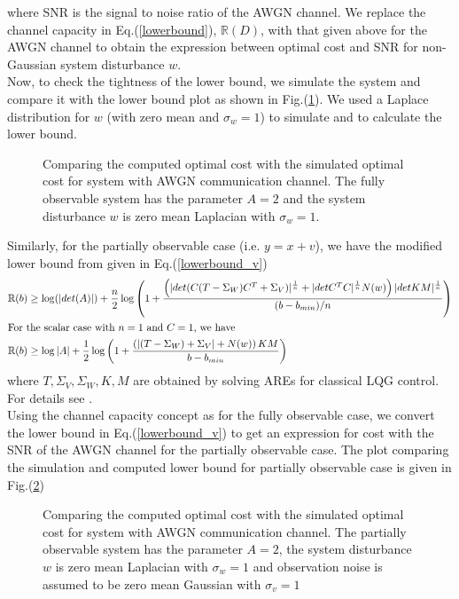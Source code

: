 \documentclass[12pt]{caltech_thesis_progress2}
\begin{document}
	where SNR is the signal to noise ratio of the AWGN channel. We replace the channel capacity in Eq.(\ref{lowerbound}), $\mathbb{R}(D)$, with that given above for the AWGN channel to obtain the expression between optimal cost and SNR for non-Gaussian system disturbance $w$.
	 \\Now, to check the tightness of the lower bound, we simulate the system and compare it with the lower bound plot as shown in Fig.(\ref{lowerbound_vs_laplace}). We used a Laplace distribution for $w$ (with zero mean and $\sigma_{w} = 1$) to simulate and to calculate the lower bound. 
		\begin{figure}[H]
			  \centering
			 \tiny{	
			}
			  \caption{Comparing the computed optimal cost with the simulated optimal cost for system with AWGN communication channel. The fully observable system has the parameter $A = 2$ and the system disturbance $w$ is zero mean Laplacian with $\sigma_{w} = 1$.}
			 \label{lowerbound_vs_laplace}
		\end{figure}	
		 Similarly, for the partially observable case (i.e. $y = x + v$), we have the modified lower bound from \cite{victoria} given in Eq.(\ref{lowerbound_v})
			  \begin{align}
			  \label{lowerbound_v}
			  \mathbb{R}(b) &\geq \log(|det(A)|) + \frac{n}{2} \log \left( 1 + \frac{\left(|det(C(T-\Sigma_{W})C^{T} + \Sigma_{V})|^{\frac{1}{n}} + |detC^{T}C|^{\frac{1}{n}}N(w)\right)|det KM|^{\frac{1}{n}}}{(b-b_{min})/n}\right)\\
			  \intertext{For the scalar case with $n = 1$ and $C = 1$, we have}
			  \mathbb{R}(b) &\geq \log|A| + \frac{1}{2} \log \left( 1 + \frac{\left(|(T-\Sigma_{W}) + \Sigma_{V}| + N(w)\right)KM}{b-b_{min}}\right)
			  \end{align}
			  where $T,\Sigma_{V}, \Sigma_{W}, K, M$ are obtained by solving AREs for classical LQG control. For details see \cite{victoria}.\\
			  Using the channel capacity concept as for the fully observable case, we convert the lower bound in Eq.(\ref{lowerbound_v}) to get an expression for cost with the SNR of the AWGN channel for the partially observable case. The plot comparing the simulation and computed lower bound for partially observable case is given in Fig.(\ref{lowerbound_vs_laplace_v})
			  \begin{figure}[H]
			  \centering
			 \tiny{	
			}
			  \caption{Comparing the computed optimal cost with the simulated optimal cost for system with AWGN communication channel. The partially observable system has the parameter $A = 2$, the system disturbance $w$ is zero mean Laplacian with $\sigma_{w} = 1$ and observation noise is assumed to be zero mean Gaussian with $\sigma_{v} = 1$}
			 \label{lowerbound_vs_laplace_v}
		\end{figure}	
\end{document}
